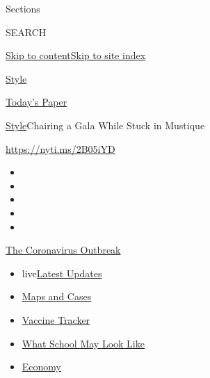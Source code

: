 Sections

SEARCH

\protect\hyperlink{site-content}{Skip to
content}\protect\hyperlink{site-index}{Skip to site index}

\href{https://www.nytimes3xbfgragh.onion/section/style}{Style}

\href{https://myaccount.nytimes3xbfgragh.onion/auth/login?response_type=cookie\&client_id=vi}{}

\href{https://www.nytimes3xbfgragh.onion/section/todayspaper}{Today's
Paper}

\href{/section/style}{Style}\textbar{}Chairing a Gala While Stuck in
Mustique

\url{https://nyti.ms/2B05iYD}

\begin{itemize}
\item
\item
\item
\item
\item
\end{itemize}

\href{https://www.nytimes3xbfgragh.onion/news-event/coronavirus?action=click\&pgtype=Article\&state=default\&region=TOP_BANNER\&context=storylines_menu}{The
Coronavirus Outbreak}

\begin{itemize}
\tightlist
\item
  live\href{https://www.nytimes3xbfgragh.onion/2020/08/01/world/coronavirus-covid-19.html?action=click\&pgtype=Article\&state=default\&region=TOP_BANNER\&context=storylines_menu}{Latest
  Updates}
\item
  \href{https://www.nytimes3xbfgragh.onion/interactive/2020/us/coronavirus-us-cases.html?action=click\&pgtype=Article\&state=default\&region=TOP_BANNER\&context=storylines_menu}{Maps
  and Cases}
\item
  \href{https://www.nytimes3xbfgragh.onion/interactive/2020/science/coronavirus-vaccine-tracker.html?action=click\&pgtype=Article\&state=default\&region=TOP_BANNER\&context=storylines_menu}{Vaccine
  Tracker}
\item
  \href{https://www.nytimes3xbfgragh.onion/interactive/2020/07/29/us/schools-reopening-coronavirus.html?action=click\&pgtype=Article\&state=default\&region=TOP_BANNER\&context=storylines_menu}{What
  School May Look Like}
\item
  \href{https://www.nytimes3xbfgragh.onion/live/2020/07/31/business/stock-market-today-coronavirus?action=click\&pgtype=Article\&state=default\&region=TOP_BANNER\&context=storylines_menu}{Economy}
\end{itemize}

